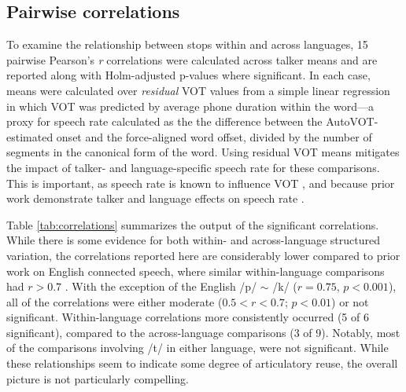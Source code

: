 \subsection{Pairwise correlations}

To examine the relationship between stops within and across languages, 15 pairwise Pearson's \textit{r} correlations were calculated across talker means and are reported along with Holm-adjusted p-values where significant. In each case, means were calculated over \textit{residual} VOT values from a simple linear regression in which VOT was predicted by average phone duration within the word---a proxy for speech rate calculated as the the difference between the AutoVOT-estimated onset and the force-aligned word offset, divided by the number of segments in the canonical form of the word. Using residual VOT means mitigates the impact of talker- and language-specific speech rate for these comparisons. This is important, as speech rate is known to influence VOT \citep{chodroff_2017_structure}, and because prior work demonstrate talker and language effects on speech rate \citep{bradlow_2017_rate}.

Table \ref{tab:correlations} summarizes the output of the significant correlations. While there is some evidence for both within- and across-language structured variation, the correlations reported here are considerably lower compared to prior work on English connected speech, where similar within-language comparisons had $r>0.7$ \citep{chodroff_2017_structure,chodroff_2019_l2}. With the exception of the English /p/ $\sim$ /k/ ($r=0.75$, $p<0.001$), all of the correlations were either moderate ($0.5<r<0.7$; $p<0.01$) or not significant. Within-language correlations more consistently occurred (5 of 6 significant), compared to the across-language comparisons (3 of 9). Notably, most of the comparisons involving /t/ in either language, were not significant. While these relationships seem to indicate some degree of articulatory reuse, the overall picture is not particularly compelling. 


